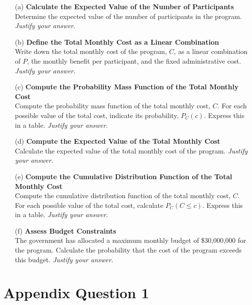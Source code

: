 \documentclass[11pt]{article}
\begin{document}
\begin{itemize}
    \item[(a)] \textbf{Calculate the Expected Value of the Number of Participants} \\
    Determine the expected value of the number of participants in the program. \emph{Justify your answer}.
    
    \item[(b)] \textbf{Define the Total Monthly Cost as a Linear Combination} \\
    Write down the total monthly cost of the program, $C$, as a linear combination of $P$, the monthly benefit per participant, and the fixed administrative cost. \emph{Justify your answer}.
    
    \item[(c)] \textbf{Compute the Probability Mass Function of the Total Monthly Cost} \\
    Compute the probability mass function of the total monthly cost, $C$. For each possible value of the total cost, indicate its probability, $P_C(c)$. Express this in a table. \emph{Justify your answer}.
    
    \item[(d)] \textbf{Compute the Expected Value of the Total Monthly Cost} \\
    Calculate the expected value of the total monthly cost of the program. \emph{Justify your answer}.
    
    \item[(e)] \textbf{Compute the Cumulative Distribution Function of the Total Monthly Cost} \\
    Compute the cumulative distribution function of the total monthly cost, $C$. For each possible value of the total cost, calculate $P_C(C \leq c)$. Express this in a table. \emph{Justify your answer}.
    
    \item[(f)] \textbf{Assess Budget Constraints} \\
    The government has allocated a maximum monthly budget of \$30,000,000 for the program. Calculate the probability that the cost of the program exceeds this budget. \emph{Justify your answer}.
\end{itemize}

\newpage
\section*{Appendix Question 1}
\end{document}
